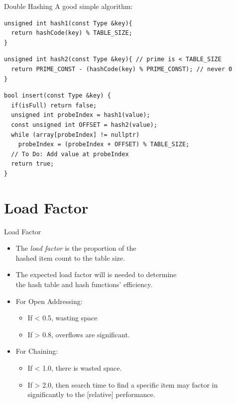 \documentclass[14pt,aspectratio=1610]{beamer}
\begin{document}
\begin{frame}[fragile]{Double Hashing}
A good simple algorithm:
\begin{lstlisting}[basicstyle=\ttfamily\footnotesize]
unsigned int hash1(const Type &key){
  return hashCode(key) % TABLE_SIZE;
}
\end{lstlisting}
\begin{lstlisting}[basicstyle=\ttfamily\footnotesize]
unsigned int hash2(const Type &key){ // prime is < TABLE_SIZE
  return PRIME_CONST - (hashCode(key) % PRIME_CONST); // never 0
}
\end{lstlisting}
\begin{lstlisting}[basicstyle=\ttfamily\footnotesize]
bool insert(const Type &key) {
  if(isFull) return false;
  unsigned int probeIndex = hash1(value);
  const unsigned int OFFSET = hash2(value);
  while (array[probeIndex] != nullptr)
    probeIndex = (probeIndex + OFFSET) % TABLE_SIZE;
  // To Do: Add value at probeIndex
  return true;
}
\end{lstlisting}
\end{frame}

\section{Load Factor}

\begin{frame}{Load Factor}
\begin{itemize}
  \item<+->
    The \emph{load factor} is the proportion of the \\
    hashed item count to the table size.

  \item<+->
    The expected load factor will is needed to determine\\ the hash table and hash functions' efficiency.
  
  \item<+->
    For Open Addressing:
    \begin{itemize}
    \item
      If < 0.5, wasting space
    \item
      If > 0.8, overflows are significant.
    \end{itemize}
  \item<+->
    For Chaining:
    \begin{itemize}
    \item
      If < 1.0, there is wasted space.
    \item
      If > 2.0, then search time to find a specific item may factor in significantly to the [relative] performance.
    \end{itemize}
\end{itemize}
\end{frame}
\end{document}
